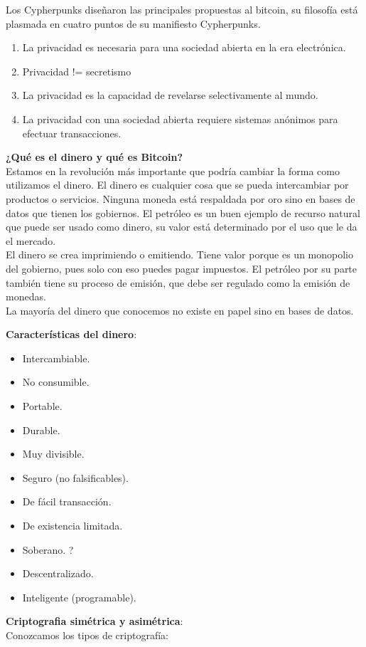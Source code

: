 \documentclass[a4paper,12pt]{lib/pub}
\begin{document}
Los Cypherpunks diseñaron las principales propuestas al bitcoin, su filosofía está plasmada en cuatro puntos de su manifiesto Cypherpunks.
\begin{enumerate}	
	\item  La privacidad es necesaria para una sociedad abierta en la era electrónica.
	\item  Privacidad != secretismo
	\item  La privacidad es la capacidad de revelarse selectivamente al mundo.
	\item  La privacidad con una sociedad abierta requiere sistemas anónimos para efectuar transacciones.
\end{enumerate}
\textbf{¿Qué es el dinero y qué es Bitcoin?}\\
Estamos en la revolución más importante que podría cambiar la forma como utilizamos el dinero.
El dinero es cualquier cosa que se pueda intercambiar por productos o servicios. Ninguna moneda está respaldada por oro sino en bases de datos que tienen los gobiernos. El petróleo es un buen ejemplo de recurso natural que puede ser usado como dinero, su valor está determinado por el uso que le da el mercado.\\
El dinero se crea imprimiendo o emitiendo. Tiene valor porque es un monopolio del gobierno, pues solo con eso puedes pagar impuestos. El petróleo por su parte también tiene su proceso de emisión, que debe ser regulado como la emisión de monedas.\\
La mayoría del dinero que conocemos no existe en papel sino en bases de datos.

\textbf{Características del dinero}:

\begin{itemize}
\item Intercambiable.
\item No consumible.
\item Portable.
\item Durable.
\item Muy divisible.
\item Seguro (no falsificables).
\item De fácil transacción.
\item De existencia limitada.
\item Soberano. ?
\item Descentralizado.
\item Inteligente (programable).
\end{itemize}

\textbf{Criptografia simétrica y asimétrica}:\\
Conozcamos los tipos de criptografía:
\end{document}
